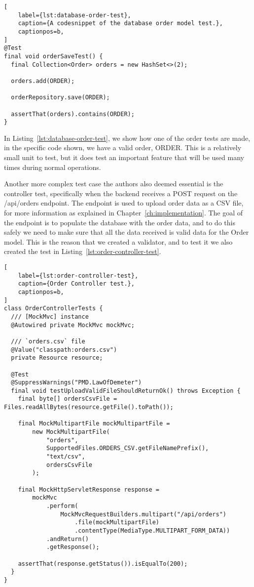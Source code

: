 
\begin{lstlisting}[
    label={lst:database-order-test},
    caption={A codesnippet of the database order model test.},
    captionpos=b,
]
@Test
final void orderSaveTest() {
  final Collection<Order> orders = new HashSet<>(2);

  orders.add(ORDER);

  orderRepository.save(ORDER);

  assertThat(orders).contains(ORDER);
}
\end{lstlisting}

In Listing~\ref{lst:database-order-test}, we show how one of the order tests are made, in the specific code shown,
we have a valid order, ORDER\@.
This is a relatively small unit to test, but it does test an important feature that will be used many times
during normal operations.

Another more complex test case the authors also deemed essential is the controller test, specifically when
the backend receives a POST request on the /api/orders endpoint.
The endpoint is used to upload order data as a CSV file, for more information as explained in
Chapter~\ref{ch:implementation}.
The goal of the endpoint is to populate the database with the order data, and to do this safely we need
to make sure that all the data received is valid data for the Order model.
This is the reason that we created a validator, and to test it we also created the test in
Listing~\ref{lst:order-controller-test}.

\begin{lstlisting}[
    label={lst:order-controller-test},
    caption={Order Controller test.},
    captionpos=b,
]
class OrderControllerTests {
  /// [MockMvc] instance
  @Autowired private MockMvc mockMvc;

  /// `orders.csv` file
  @Value("classpath:orders.csv")
  private Resource resource;

  @Test
  @SuppressWarnings("PMD.LawOfDemeter")
  final void testUploadValidFileShouldReturnOk() throws Exception {
    final byte[] ordersCsvFile = Files.readAllBytes(resource.getFile().toPath());

    final MockMultipartFile mockMultipartFile =
        new MockMultipartFile(
            "orders",
            SupportedFiles.ORDERS_CSV.getFileNamePrefix(),
            "text/csv",
            ordersCsvFile
        );

    final MockHttpServletResponse response =
        mockMvc
            .perform(
                MockMvcRequestBuilders.multipart("/api/orders")
                    .file(mockMultipartFile)
                    .contentType(MediaType.MULTIPART_FORM_DATA))
            .andReturn()
            .getResponse();

    assertThat(response.getStatus()).isEqualTo(200);
  }
}
\end{lstlisting}

